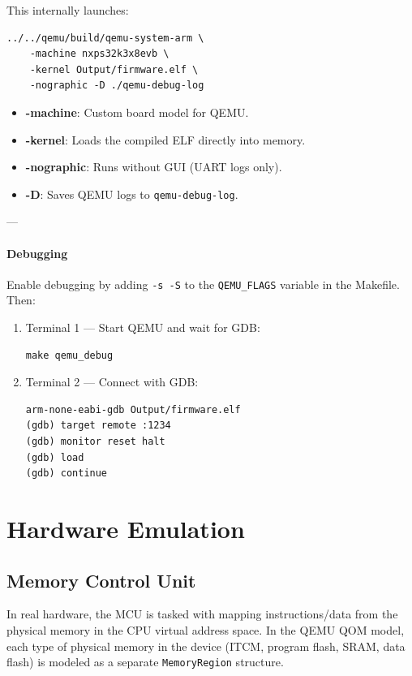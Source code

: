 \documentclass{article}
\begin{document}
This internally launches:
\begin{verbatim}
../../qemu/build/qemu-system-arm \
    -machine nxps32k3x8evb \
    -kernel Output/firmware.elf \
    -nographic -D ./qemu-debug-log
\end{verbatim}

\begin{itemize}
  \item \textbf{-machine}: Custom board model for QEMU.
  \item \textbf{-kernel}: Loads the compiled ELF directly into memory.
  \item \textbf{-nographic}: Runs without GUI (UART logs only).
  \item \textbf{-D}: Saves QEMU logs to \texttt{qemu-debug-log}.
\end{itemize}

---

\paragraph{Debugging}
Enable debugging by adding \texttt{-s -S} to the \texttt{QEMU\_FLAGS} variable in the Makefile.  
Then:
\begin{enumerate}
  \item Terminal 1 — Start QEMU and wait for GDB:
  \begin{verbatim}
make qemu_debug
  \end{verbatim}

  \item Terminal 2 — Connect with GDB:
  \begin{verbatim}
arm-none-eabi-gdb Output/firmware.elf
(gdb) target remote :1234
(gdb) monitor reset halt
(gdb) load
(gdb) continue
  \end{verbatim}
\end{enumerate}



\section{Hardware Emulation}

\subsection{Memory Control Unit}
In real hardware, the MCU is tasked with mapping instructions/data from the physical memory in the CPU virtual address space.
In the QEMU QOM model, each type of physical memory in the device 
(ITCM, program flash, SRAM, data flash) is modeled as a separate 
\texttt{MemoryRegion} structure.
\end{document}
